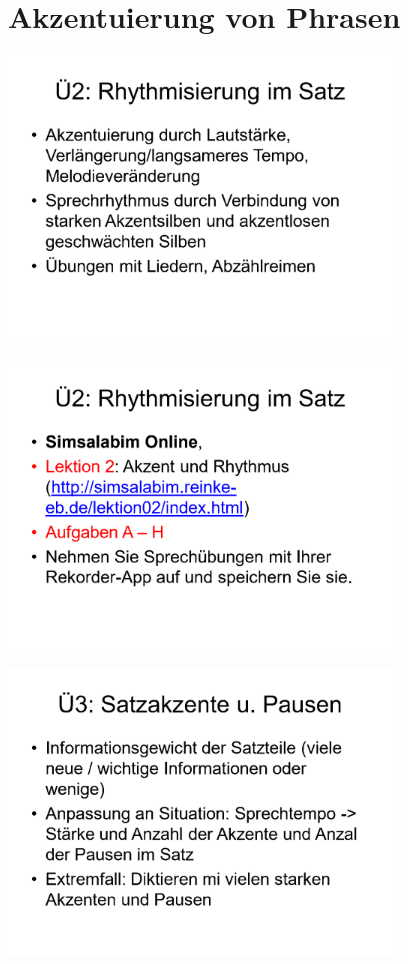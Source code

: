 \documentclass[
  letterpaper,
]{scrbook}
\begin{document}
\hypertarget{sec-satzakzent}{%
\chapter{Akzentuierung von Phrasen}\label{sec-satzakzent}}

\includegraphics[width=4in,height=\textheight]{./pictures/sprachlabor/Phonetikuebungen_S01_Page4.png}

\includegraphics[width=4in,height=\textheight]{./pictures/sprachlabor/Phonetikuebungen_S01_Page5.png}

\includegraphics[width=4in,height=\textheight]{./pictures/sprachlabor/Phonetikuebungen_S01_Page6.png}
\end{document}
